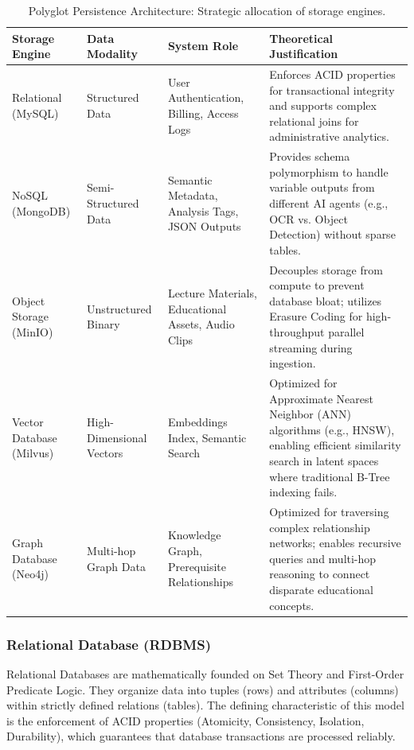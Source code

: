 \begin{table}[H]
    \centering
    \caption{Polyglot Persistence Architecture: Strategic allocation of storage engines.}\label{tab:polyglot_db}
    \renewcommand{\arraystretch}{1.5}
    \small 
    \begin{tabularx}{\textwidth}{|p{2.0cm}|p{2.0cm}|X|X|}
    \hline
    {Storage Engine} & {Data Modality} & {System Role} & {Theoretical Justification} \\
    \hline
    Relational (MySQL) & Structured Data & User Authentication, Billing, Access Logs & Enforces ACID properties for transactional integrity and supports complex relational joins for administrative analytics. \\
    \hline
    NoSQL (MongoDB) & Semi-Structured Data & Semantic Metadata, Analysis Tags, JSON Outputs & Provides schema polymorphism to handle variable outputs from different AI agents (e.g., OCR vs. Object Detection) without sparse tables. \\
    \hline
    Object Storage (MinIO) & Unstructured Binary & Lecture Materials, Educational Assets, Audio Clips & Decouples storage from compute to prevent database bloat; utilizes Erasure Coding for high-throughput parallel streaming during ingestion. \\
    \hline
    Vector Database (Milvus) & High-Dimensional Vectors & Embeddings Index, Semantic Search & Optimized for Approximate Nearest Neighbor (ANN) algorithms (e.g., HNSW), enabling efficient similarity search in latent spaces where traditional B-Tree indexing fails. \\
    \hline
    Graph Database (Neo4j) & Multi-hop Graph Data & Knowledge Graph, Prerequisite Relationships & Optimized for traversing complex relationship networks; enables recursive queries and multi-hop reasoning to connect disparate educational concepts. \\
    \hline
    \end{tabularx}
\end{table}

\subsubsection*{Relational Database (RDBMS)}
Relational Databases are mathematically founded on Set Theory and First-Order Predicate Logic. They organize data into tuples (rows) and attributes (columns) within strictly defined relations (tables). The defining characteristic of this model is the enforcement of ACID properties (Atomicity, Consistency, Isolation, Durability), which guarantees that database transactions are processed reliably.


